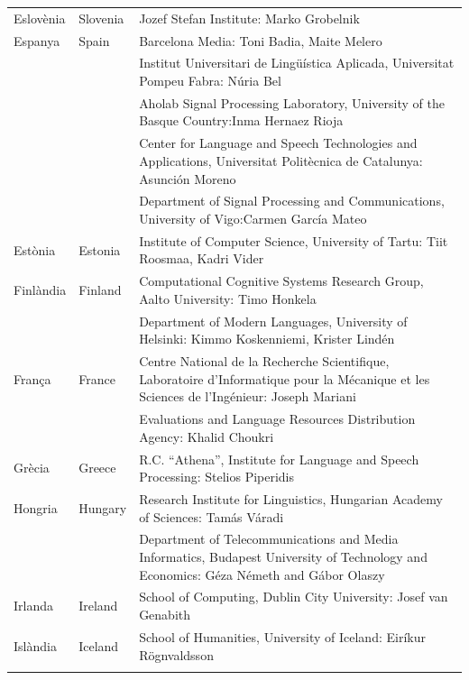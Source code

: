 \begin{multicols}{2}
\begin{itemize}
\begin{longtable}{@{}llp{113mm}@{}}
  Eslovènia & \textcolor{grey1}{Slovenia} & Jozef Stefan Institute: Marko Grobelnik \\ \addlinespace 
  Espanya & \textcolor{grey1}{Spain} & Barcelona Media: Toni Badia, Maite Melero \\ \addlinespace 
  & & Institut Universitari de Lingüística Aplicada, Universitat Pompeu Fabra: Núria Bel \\ \addlinespace 
  & & Aholab Signal Processing Laboratory, University of the Basque Country:\newline Inma Hernaez Rioja \\ \addlinespace 
  & & Center for Language and Speech Technologies and Applications, Universitat Politècnica de Catalunya:  Asunción Moreno \\ \addlinespace 
  & & Department of Signal Processing and Communications, University of Vigo:\newline Carmen García Mateo \\ \addlinespace 
  Estònia & \textcolor{grey1}{Estonia} & Institute of Computer Science, University of Tartu: Tiit Roosmaa, Kadri Vider\\ \addlinespace
  Finlàndia & \textcolor{grey1}{Finland} & Computational Cognitive Systems Research Group, Aalto University: Timo Honkela\\ \addlinespace
  & & Department of Modern Languages, University of Helsinki: Kimmo Koskenniemi, Krister Lindén \\ \addlinespace
  França & \textcolor{grey1}{France} & Centre National de la Recherche Scientifique, Laboratoire d'Informatique pour la Mécanique et les Sciences de l'Ingénieur: Joseph Mariani \\ \addlinespace
  & & Evaluations and Language Resources Distribution Agency: Khalid Choukri\\ \addlinespace 
  Grècia & \textcolor{grey1}{Greece} & R.C. “Athena”, Institute for Language and Speech Processing: Stelios Piperidis\\ \addlinespace
  Hongria & \textcolor{grey1}{Hungary} & Research Institute for Linguistics, Hungarian Academy of Sciences: Tamás Váradi\\  \addlinespace
  & & Department of Telecommunications and Media Informatics, Budapest University of Technology and Economics: Géza Németh and Gábor Olaszy\\ \addlinespace
  Irlanda & \textcolor{grey1}{Ireland} & School of Computing, Dublin City University: Josef van Genabith\\ \addlinespace
  Islàndia & \textcolor{grey1}{Iceland} & School of Humanities, University of Iceland: Eiríkur Rögnvaldsson\\ \addlinespace

\end{longtable}
\end{itemize}
\end{multicols}
